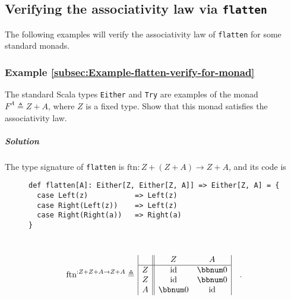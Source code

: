 \subsection{Verifying the associativity law via \texttt{flatten}}

\begin{comment}
The associativity law of \lstinline!flatMap! was demonstrated to
hold for the \lstinline!Option! monad in Chapter~\ref{chap:Filterable-functors}
(see Eq.~(\ref{eq:associativity-law-of-flatMap-for-Option}) in the
proof of Statement~\ref{subsec:Statement-filterable-coproduct-1}). 
\end{comment}
The following examples will verify the associativity law of \lstinline!flatten!
for some standard monads.

\subsubsection{Example \label{subsec:Example-flatten-verify-for-monad}\ref{subsec:Example-flatten-verify-for-monad}}

The standard Scala types \lstinline!Either! and \lstinline!Try!
are examples of the monad $F^{A}\triangleq Z+A$, where $Z$ is a
fixed type. Show that this monad satisfies the associativity law.

\subparagraph{Solution}

The type signature of \lstinline!flatten! is $\text{ftn}:Z+\left(Z+A\right)\rightarrow Z+A$,
and its code is

\begin{wrapfigure}{l}{0.6\columnwidth}%
\vspace{-0.2\baselineskip}
\begin{lstlisting}
def flatten[A]: Either[Z, Either[Z, A]] => Either[Z, A] = {
  case Left(z)           => Left(z)
  case Right(Left(z))    => Left(z)
  case Right(Right(a))   => Right(a)
}
\end{lstlisting}

\vspace{-3.2\baselineskip}
\end{wrapfigure}%

~\vspace{-1.2\baselineskip}
\[
\text{ftn}^{:Z+Z+A\rightarrow Z+A}\triangleq\,\begin{array}{|c||cc|}
 & Z & A\\
\hline Z & \text{id} & \bbnum 0\\
Z & \text{id} & \bbnum 0\\
A & \bbnum 0 & \text{id}
\end{array}\quad.
\]
\vspace{-0.8\baselineskip}

